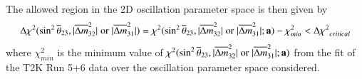 The allowed region in the 2D oscillation parameter space is then given by
\begin{equation}
\displaystyle
\Delta\chi^{2}(\sin^{2}\overline{\theta}_{23},|\overline{\Delta m}^{2}_{32}| \; \textrm{or} \; |\overline{\Delta m}^{2}_{31}|) =
\chi^{2}(\sin^{2}\overline{\theta}_{23},|\overline{\Delta m}^{2}_{32}| \; \textrm{or} \; |\overline{\Delta m}^{2}_{31}|; {\bf a}) - \chi_{min}^{2} < \Delta{\chi^{2}}_{critical}
\label{eq:chiconfregion}
\end{equation}
where $\chi_{min}^{2}$ is the minimum value of $\chi^{2}(\sin^{2}\overline{\theta}_{23},|\overline{\Delta m}^{2}_{32}| \; \textrm{or} \; |\overline{\Delta m}^{2}_{31}|; {\bf a})$
from the fit of the T2K Run 5+6 data over the oscillation parameter space considered.

